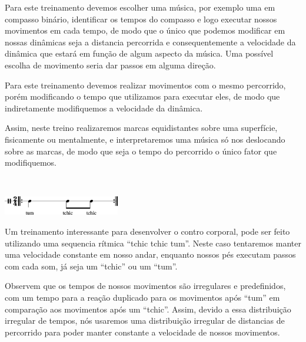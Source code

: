 \begin{example}
Para este treinamento devemos escolher uma música, por exemplo uma em compasso binário,
identificar os tempos do compasso e logo executar nossos movimentos em cada tempo,
de modo que o único que podemos modificar em nossas dinâmicas seja a distancia percorrida 
e consequentemente a velocidade da dinâmica que estará em função de algum aspecto da música.
Uma possível escolha de movimento seria dar passos em alguma direção.
\end{example}

\begin{example}
Para este treinamento devemos realizar movimentos com o mesmo percorrido, 
porém modificando o tempo que utilizamos para executar eles, 
de modo que indiretamente modifiquemos a velocidade da dinâmica.

Assim, neste treino realizaremos marcas equidistantes sobre uma superfície, fisicamente ou mentalmente,  
e interpretaremos uma música só nos deslocando sobre as marcas,
de modo que seja o tempo do percorrido o único fator que modifiquemos.
\end{example}


\begin{example}~

\begin{center}
\includegraphics[width=0.38\textwidth]{chapters/cap-musicalidade/abc-veltchictchictum-1.eps}
\end{center}

\vspace{-10pt}

Um treinamento interessante para desenvolver o contro corporal,
pode ser feito utilizando uma sequencia rítmica ``tchic tchic tum''.
Neste caso tentaremos manter uma velocidade constante em nosso andar,
enquanto nossos pés executam passos com cada som, já seja um ``tchic'' ou um ``tum''.

Observem que os tempos de nossos movimentos são irregulares e predefinidos,
com um tempo para a reação duplicado para os movimentos após ``tum'' 
em comparação aos movimentos após um ``tchic''.
Assim, devido a essa distribuição irregular de tempos, 
nós usaremos uma distribuição irregular de distancias de percorrido 
para poder manter constante a velocidade de nossos movimentos.
\end{example}




